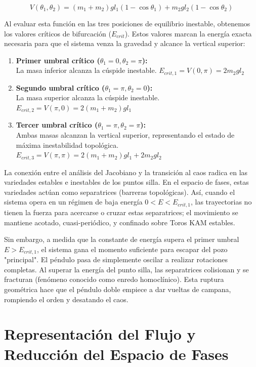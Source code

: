 \documentclass[13pt]{extarticle}
\begin{document}
\[
V(\theta_1, \theta_2) = (m_1+m_2)gl_1(1-\cos\theta_1) + m_2gl_2(1-\cos\theta_2)
\]

Al evaluar esta función en las tres posiciones de equilibrio inestable, obtenemos los valores críticos de bifurcación ($E_{crit}$). Estos valores marcan la energía exacta necesaria para que el sistema venza la gravedad y alcance la vertical superior:

\begin{enumerate}
    \item \textbf{Primer umbral crítico ($\theta_1 = 0, \theta_2 = \pi$):} \\
    La masa inferior alcanza la cúspide inestable. $E_{crit,1} = V(0, \pi) = 2m_2gl_2$
    
    \item \textbf{Segundo umbral crítico ($\theta_1 = \pi, \theta_2 = 0$):} \\
    La masa superior alcanza la cúspide inestable. $E_{crit,2} = V(\pi, 0) = 2(m_1+m_2)gl_1$
    
    \item \textbf{Tercer umbral crítico ($\theta_1 = \pi, \theta_2 = \pi$):} \\
    Ambas masas alcanzan la vertical superior, representando el estado de máxima inestabilidad topológica. $E_{crit,3} = V(\pi, \pi) = 2(m_1+m_2)gl_1 + 2m_2gl_2$
\end{enumerate}

La conexión entre el análisis del Jacobiano y la transición al caos radica en las variedades estables e inestables de los puntos silla. En el espacio de fases, estas variedades actúan como separatrices (barreras topológicas). Así, cuando el sistema opera en un régimen de baja energía $0 < E < E_{crit,1}$, las trayectorias no tienen la fuerza para acercarse o cruzar estas separatrices; el movimiento se mantiene acotado, cuasi-periódico, y confinado sobre Toros KAM estables.

Sin embargo, a medida que la constante de energía supera el primer umbral $E > E_{crit,1}$, el sistema gana el momento suficiente para escapar del pozo "principal". El péndulo pasa de simplemente oscilar a realizar rotaciones completas. Al superar la energía del punto silla, las separatrices colisionan y se fracturan (fenómeno conocido como enredo homoclínico). Esta ruptura geométrica hace que el péndulo doble empiece a dar vueltas de campana, rompiendo el orden y desatando el caos.


\section{Representación del Flujo y Reducción del Espacio de Fases}
\end{document}
